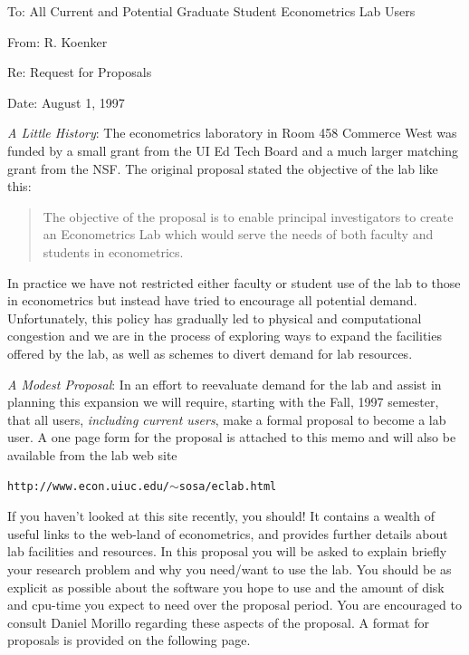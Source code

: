 \documentclass[11pt]{article}
\begin{document}
\noindent
To:	All Current and Potential Graduate Student Econometrics Lab Users

\noindent
From:	R. Koenker

\noindent
Re:	Request for Proposals

\noindent
Date:	August 1, 1997

\vspace{10mm}
{\it A Little History}:  \hspace{5mm} The econometrics laboratory in Room 458 Commerce West
was funded by a small grant from the UI Ed Tech Board and a much larger
matching grant from the NSF.  The original proposal stated the objective 
of the lab like this:

\vspace{3mm}
\begin{quote}
The objective of the proposal is to enable principal investigators 
to create an Econometrics Lab which would serve the needs of both faculty and
students in econometrics.
\end{quote}

\vspace{3mm}
In practice we have not restricted either faculty or student use of the lab
to those in econometrics but instead have tried to encourage all potential 
demand.  Unfortunately, this policy has gradually led to physical and 
computational congestion and we are in the process of exploring ways to expand the facilities offered by the lab, as well as schemes to divert demand for lab resources.

\vspace{5mm}
{\it A Modest Proposal}: \hspace{5mm}  In an effort to reevaluate demand for the lab and 
assist in planning this expansion we will require, starting with the Fall, 1997 semester,
that all users, {\em including current users}, make a formal proposal to become a lab user.  A one page 
form for the proposal is attached to this memo and will also be available from the lab web site

\vspace{3mm}
\begin{center}
{\tt http://www.econ.uiuc.edu/}$\sim${\tt sosa/eclab.html}
\end{center}

\vspace{3mm}
If you haven't looked at this site recently, you should!  
It contains a wealth of useful links to the web-land of econometrics, and provides further details about lab facilities and resources.
In this proposal you 
will be asked to explain briefly your research problem and why you need/want 
to use the lab.  You should be as explicit as possible about the software
you hope to use and the amount of disk and cpu-time you expect to need 
over the proposal period.  You are encouraged to consult Daniel Morillo 
regarding these aspects of the proposal.  A format for proposals is provided on the following page.
\end{document}
